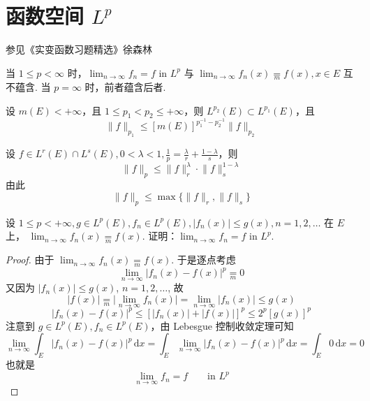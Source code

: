 \section{函数空间 \texorpdfstring{$L^{p}$}{L^p}}

参见《实变函数习题精选》徐森林

\begin{remark}
当 $1\leq p<\infty$ 时，$\lim_{ n \to \infty }f_n=f$ in $L^{p}$ 与 $\lim_{ n \to \infty }f_n (x)\underset{ m }{ = }f (x), x\in E$ 互不蕴含. 当 $p=\infty$ 时，前者蕴含后者.
\end{remark}
\begin{theorem}[$L^{p_1},L^{p_2}$ 空间包含关系]
设 $m(E)<+\infty$，且 $1\leq p_1<p_2\leq+\infty$，则 $L^{p_2}(E)\subset L^{p_1}(E)$，且
\begin{equation}
\lVert f \rVert _{p_1}\leq [m(E)]^{p_1^{-1}-p_2 ^{-1}}\lVert f \rVert _{p_2}
\label{50d515}
\end{equation}
\end{theorem}

\begin{theorem}[$L^{p}$ 空间两边夹住]
设 $f\in L^{r}(E)\cap L^{s}(E),0<\lambda<1,\frac{1}{p}=\frac{\lambda}{r}+\frac{1-\lambda}{s}$，则
\[
\lVert f \rVert _{p}\leq \lVert f \rVert _{r}^{\lambda}\cdot \lVert f \rVert _{s}^{1-\lambda}
\]
由此
\begin{equation}
\lVert f \rVert _{p}\leq \max\{ \lVert f \rVert _{r},\lVert f \rVert _{s} \}
\label{291fe9}
\end{equation}
\end{theorem}

\begin{exercise}[逐点收敛加上什么条件能推出 $L^{p}$ 收敛]
设 $1\leq p<+\infty, g\in L^{p}(E), f_n\in L^{p}(E),\lvert f_n(x) \rvert\leq g(x),n=1,2,\dots$ 在 $E$ 上， $\lim_{ n \to \infty }f_n(x)\underset{ m }{ = }f(x)$. 证明：$\lim_{ n \to \infty }f_n=f$ in $L^{p}$.
\end{exercise}
\begin{proof}
由于 $\lim_{ n \to \infty }f_n(x)\underset{ m }{ = }f(x)$. 于是逐点考虑
\[
\lim_{ n \to \infty } \lvert f_n(x)-f(x) \rvert ^{p}\underset{ m }{ = }0
\]
又因为 $\lvert f_n(x) \rvert\leq g(x)$, $n=1,2,\dots$, 故
\[
\lvert f(x) \rvert\underset{ m }{ = }\lvert \lim_{ n \to \infty } f_n(x) \rvert =\lim_{ n \to \infty } \lvert f_n(x) \rvert \leq g(x)
\]
\[
\lvert f_n(x)-f(x) \rvert ^{p}\leq [\lvert f_n(x) \rvert +\lvert f(x) \rvert ]^{p}\leq 2^{p}[g(x)]^{p}
\]
注意到 $g\in L^{p}(E), f_n\in L^{p}(E)$，由 Lebesgue 控制收敛定理可知
\[
\lim_{ n \to \infty } \int_{E}^{} \lvert f_n(x) -f(x)\rvert ^{p} \, \mathrm{d}x =\int_{E}^{} \lim_{ n \to \infty } \lvert f_n(x)-f(x) \rvert ^{p} \, \mathrm{d}x =\int_{E}^{} 0 \, \mathrm{d}x =0
\]
也就是
\[
\lim_{ n \to \infty } f_n=f\qquad \text{in }L^{p}
\]
\end{proof}

